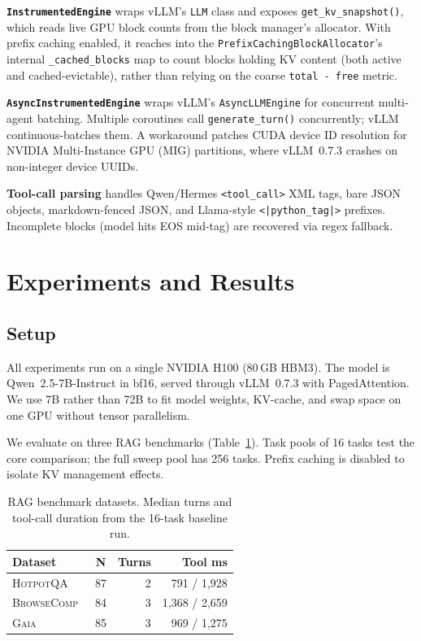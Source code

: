 \documentclass[10pt,twocolumn]{article}
\begin{document}
\textbf{\texttt{InstrumentedEngine}} wraps vLLM's \texttt{LLM} class and exposes \texttt{get\_kv\_snapshot()}, which reads live GPU block counts from the block manager's allocator. With prefix caching enabled, it reaches into the \texttt{PrefixCachingBlockAllocator}'s internal \texttt{\_cached\_blocks} map to count blocks holding KV content (both active and cached-evictable), rather than relying on the coarse \texttt{total - free} metric.

\textbf{\texttt{AsyncInstrumentedEngine}} wraps vLLM's \texttt{AsyncLLMEngine} for concurrent multi-agent batching. Multiple coroutines call \texttt{generate\_turn()} concurrently; vLLM continuous-batches them. A workaround patches CUDA device ID resolution for NVIDIA Multi-Instance GPU (MIG) partitions, where vLLM~0.7.3 crashes on non-integer device UUIDs.

\textbf{Tool-call parsing} handles Qwen/Hermes \texttt{<tool\_call>} XML tags, bare JSON objects, markdown-fenced JSON, and Llama-style \texttt{<|python\_tag|>} prefixes. Incomplete blocks (model hits EOS mid-tag) are recovered via regex fallback.

\section{Experiments and Results}

\subsection{Setup}

All experiments run on a single NVIDIA H100 (80\,GB HBM3). The model is Qwen~2.5-7B-Instruct in bf16, served through vLLM~0.7.3 with PagedAttention. We use 7B rather than 72B to fit model weights, KV-cache, and swap space on one GPU without tensor parallelism.

We evaluate on three RAG benchmarks (Table~\ref{tab:datasets}). Task pools of 16 tasks test the core comparison; the full sweep pool has 256 tasks. Prefix caching is disabled to isolate KV management effects.

\begin{table}[t]
\caption{RAG benchmark datasets. Median turns and tool-call duration from the 16-task baseline run.}
\label{tab:datasets}
\centering
\footnotesize
\begin{tabular}{lcrr}
\toprule
\textbf{Dataset} & \textbf{N} & \textbf{Turns} & \textbf{Tool ms} \\
\midrule
\textsc{HotpotQA}~\cite{yang2018hotpotqa}     & 87 & 2 & 791 / 1,928 \\
\textsc{BrowseComp}~\cite{wei2025browsecomp}   & 84 & 3 & 1,368 / 2,659 \\
\textsc{Gaia}~\cite{mialon2023gaia}            & 85 & 3 & 969 / 1,275 \\
\bottomrule
\end{tabular}
\end{table}
\end{document}
